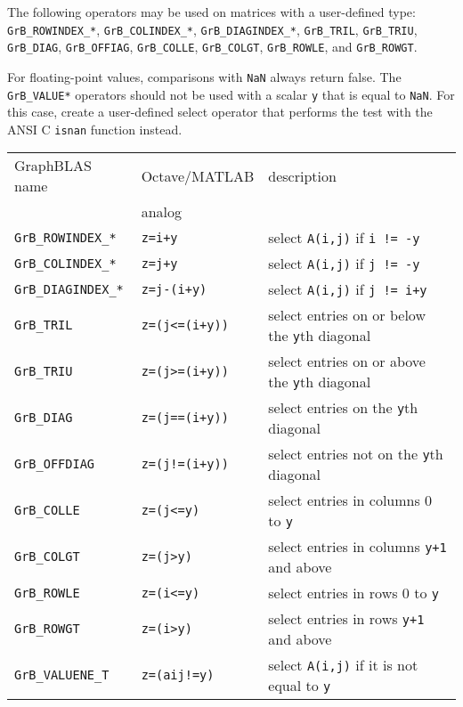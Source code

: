 \documentclass[12pt]{article}
\begin{document}
{The following operators may be used on matrices with a user-defined type:
\verb'GrB_ROWINDEX_*',
\verb'GrB_COLINDEX_*',
\verb'GrB_DIAGINDEX_*',
\verb'GrB_TRIL', \newline
\verb'GrB_TRIU',
\verb'GrB_DIAG',
\verb'GrB_OFFIAG',
\verb'GrB_COLLE',
\verb'GrB_COLGT',
\verb'GrB_ROWLE',
and
\verb'GrB_ROWGT'.

For floating-point values, comparisons with \verb'NaN' always return false.
The \verb'GrB_VALUE*' operators should not be used with a scalar \verb'y' that is
equal to \verb'NaN'.  For this case, create a user-defined select operator that
performs the test with the ANSI C \verb'isnan' function instead.

\vspace{0.2in}
\noindent
{\footnotesize
\begin{tabular}{lll}
\hline
GraphBLAS name          & Octave/MATLAB     & description \\
                        & analog            & \\
\hline
\verb'GrB_ROWINDEX_*'    & \verb'z=i+y'         & select \verb'A(i,j)' if \verb'i != -y' \\
\verb'GrB_COLINDEX_*'    & \verb'z=j+y'         & select \verb'A(i,j)' if \verb'j != -y' \\
\verb'GrB_DIAGINDEX_*'   & \verb'z=j-(i+y)'     & select \verb'A(i,j)' if \verb'j != i+y' \\
\hline
\verb'GrB_TRIL'    & \verb'z=(j<=(i+y))'  & select entries on or below the \verb'y'th diagonal \\
\verb'GrB_TRIU'    & \verb'z=(j>=(i+y))'  & select entries on or above the \verb'y'th diagonal \\
\verb'GrB_DIAG'    & \verb'z=(j==(i+y))'  & select entries on the \verb'y'th diagonal \\
\verb'GrB_OFFDIAG' & \verb'z=(j!=(i+y))'  & select entries not on the \verb'y'th diagonal \\
\verb'GrB_COLLE'   & \verb'z=(j<=y)'      & select entries in columns 0 to \verb'y' \\
\verb'GrB_COLGT'   & \verb'z=(j>y)'       & select entries in columns \verb'y+1' and above \\
\verb'GrB_ROWLE'   & \verb'z=(i<=y)'      & select entries in rows 0 to \verb'y' \\
\verb'GrB_ROWGT'   & \verb'z=(i>y)'       & select entries in rows \verb'y+1' and above \\
\hline
\verb'GrB_VALUENE_T'     & \verb'z=(aij!=y)'    & select \verb'A(i,j)' if it is not equal to \verb'y'\\

\end{tabular}}}
\end{document}
